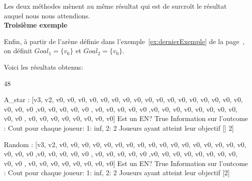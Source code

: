 Les deux méthodes mènent au même résultat qui est de surcroît le résultat auquel nous nous attendions. \\

\noindent \textbf{Troisième exemple}

Enfin, à partir de l'arène définie dans l'exemple~\ref{ex:dernierExemple} de la page~\pageref{ex:dernierExemple}, on définit $Goal_1 = \{ v_6 \}$ et $Goal_2 = \{ v_0 \}$.

\begin{figure}[ht!]
	\centering

\end{figure}

Voici les résultats obtenus:

\begin{code} 48

A_star : 
[v3, v2, v0, v0, v0, v0, v0, v0, v0, v0, v0,
v0, v0, v0, v0, v0, v0, v0, v0, v0, v0, v0 ,v0, v0,
v0, v0, v0 , v0, v0, v0, v0, v0 ,v0, v0, v0, v0, v0,
v0, v0, v0, v0, v0 , v0, v0, v0, v0, v0, v0, v0, v0]
Est un EN?  True
Information sur l'outcome : 
Cout pour chaque joueur:  {1: inf, 2: 2}
Joueurs ayant atteint leur objectif  [] 2]

Random :
[v3, v2, v0, v0, v0, v0, v0, v0, v0, v0, v0,
v0, v0, v0, v0, v0, v0, v0, v0, v0, v0, v0 ,v0, v0,
v0, v0, v0 , v0, v0, v0, v0, v0 ,v0, v0, v0, v0, v0,
v0, v0, v0, v0, v0 , v0, v0, v0, v0, v0, v0, v0, v0]
Est un EN?  True
Information sur l'outcome :
Cout pour chaque joueur:  {1: inf, 2: 2}
Joueurs ayant atteint leur objectif  [2]

\end{code}


